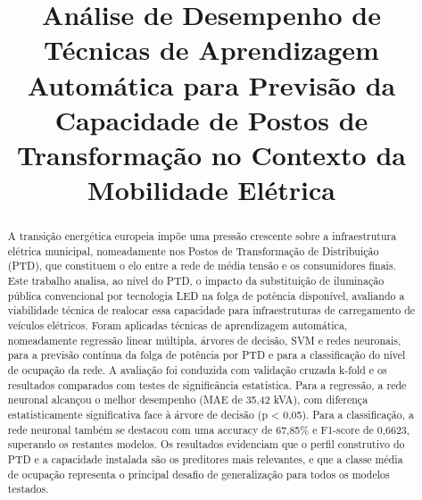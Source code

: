 \documentclass[conference]{IEEEtran}
\begin{document}
\title{Análise de Desempenho de Técnicas de Aprendizagem Automática para Previsão da Capacidade de Postos de Transformação no Contexto da Mobilidade Elétrica}

\author{
\and
{}
\and
{}
}

\maketitle

\begin{abstract}
A transição energética europeia impõe uma pressão crescente sobre a infraestrutura elétrica municipal, nomeadamente nos Postos de Transformação de Distribuição (PTD), que constituem o elo entre a rede de média tensão e os consumidores finais. Este trabalho analisa, ao nível do PTD, o impacto da substituição de iluminação pública convencional por tecnologia LED na folga de potência disponível, avaliando a viabilidade técnica de realocar essa capacidade para infraestruturas de carregamento de veículos elétricos. Foram aplicadas técnicas de aprendizagem automática, nomeadamente regressão linear múltipla, árvores de decisão, SVM e redes neuronais, para a previsão contínua da folga de potência por PTD e para a classificação do nível de ocupação da rede. A avaliação foi conduzida com validação cruzada k-fold e os resultados comparados com testes de significância estatística. Para a regressão, a rede neuronal alcançou o melhor desempenho (MAE de 35,42 kVA), com diferença estatisticamente significativa face à árvore de decisão (p < 0,05). Para a classificação, a rede neuronal também se destacou com uma accuracy de 67,85\% e F1-score de 0,6623, superando os restantes modelos. Os resultados evidenciam que o perfil construtivo do PTD e a capacidade instalada são os preditores mais relevantes, e que a classe média de ocupação representa o principal desafio de generalização para todos os modelos testados.
\end{abstract}
\end{document}
